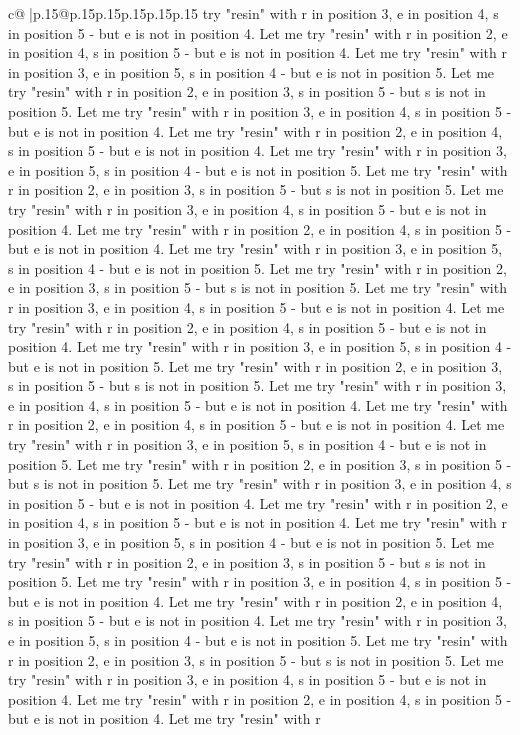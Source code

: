 \documentclass{article}
\begin{document}
{\begin{supertabular}{c@{$\;$}|p{.15\linewidth}@{}p{.15\linewidth}p{.15\linewidth}p{.15\linewidth}p{.15\linewidth}p{.15\linewidth}}
{{{try "resin" with r in position 3, e in position 4, s in position 5 {-} but e is not in position 4. Let me try "resin" with r in position 2, e in position 4, s in position 5 {-} but e is not in position 4. Let me try "resin" with r in position 3, e in position 5, s in position 4 {-} but e is not in position 5. Let me try "resin" with r in position 2, e in position 3, s in position 5 {-} but s is not in position 5. Let me try "resin" with r in position 3, e in position 4, s in position 5 {-} but e is not in position 4. Let me try "resin" with r in position 2, e in position 4, s in position 5 {-} but e is not in position 4. Let me try "resin" with r in position 3, e in position 5, s in position 4 {-} but e is not in position 5. Let me try "resin" with r in position 2, e in position 3, s in position 5 {-} but s is not in position 5. Let me try "resin" with r in position 3, e in position 4, s in position 5 {-} but e is not in position 4. Let me try "resin" with r in position 2, e in position 4, s in position 5 {-} but e is not in position 4. Let me try "resin" with r in position 3, e in position 5, s in position 4 {-} but e is not in position 5. Let me try "resin" with r in position 2, e in position 3, s in position 5 {-} but s is not in position 5. Let me try "resin" with r in position 3, e in position 4, s in position 5 {-} but e is not in position 4. Let me try "resin" with r in position 2, e in position 4, s in position 5 {-} but e is not in position 4. Let me try "resin" with r in position 3, e in position 5, s in position 4 {-} but e is not in position 5. Let me try "resin" with r in position 2, e in position 3, s in position 5 {-} but s is not in position 5. Let me try "resin" with r in position 3, e in position 4, s in position 5 {-} but e is not in position 4. Let me try "resin" with r in position 2, e in position 4, s in position 5 {-} but e is not in position 4. Let me try "resin" with r in position 3, e in position 5, s in position 4 {-} but e is not in position 5. Let me try "resin" with r in position 2, e in position 3, s in position 5 {-} but s is not in position 5. Let me try "resin" with r in position 3, e in position 4, s in position 5 {-} but e is not in position 4. Let me try "resin" with r in position 2, e in position 4, s in position 5 {-} but e is not in position 4. Let me try "resin" with r in position 3, e in position 5, s in position 4 {-} but e is not in position 5. Let me try "resin" with r in position 2, e in position 3, s in position 5 {-} but s is not in position 5. Let me try "resin" with r in position 3, e in position 4, s in position 5 {-} but e is not in position 4. Let me try "resin" with r in position 2, e in position 4, s in position 5 {-} but e is not in position 4. Let me try "resin" with r in position 3, e in position 5, s in position 4 {-} but e is not in position 5. Let me try "resin" with r in position 2, e in position 3, s in position 5 {-} but s is not in position 5. Let me try "resin" with r in position 3, e in position 4, s in position 5 {-} but e is not in position 4. Let me try "resin" with r in position 2, e in position 4, s in position 5 {-} but e is not in position 4. Let me try "resin" with r }}}
\end{supertabular}}
\end{document}
